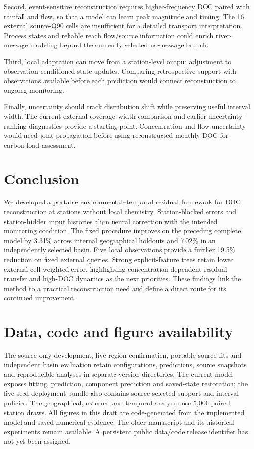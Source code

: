 \documentclass[11pt]{article}
\begin{document}
Second, event-sensitive reconstruction requires higher-frequency DOC paired with rainfall and flow, so that a model can learn peak magnitude and timing. The 16 external source-Q90 cells are insufficient for a detailed transport interpretation. Process states and reliable reach flow/source information could enrich river-message modeling beyond the currently selected no-message branch.

Third, local adaptation can move from a station-level output adjustment to observation-conditioned state updates. Comparing retrospective support with observations available before each prediction would connect reconstruction to ongoing monitoring.

Finally, uncertainty should track distribution shift while preserving useful interval width. The current external coverage--width comparison and earlier uncertainty-ranking diagnostics provide a starting point. Concentration and flow uncertainty would need joint propagation before using reconstructed monthly DOC for carbon-load assessment.

\section{Conclusion}
We developed a portable environmental--temporal residual framework for DOC reconstruction at stations without local chemistry. Station-blocked errors and station-hidden input histories align neural correction with the intended monitoring condition. The fixed procedure improves on the preceding complete model by 3.31\% across internal geographical holdouts and 7.02\% in an independently selected basin. Five local observations provide a further 19.5\% reduction on fixed external queries. Strong explicit-feature trees retain lower external cell-weighted error, highlighting concentration-dependent residual transfer and high-DOC dynamics as the next priorities. These findings link the method to a practical reconstruction need and define a direct route for its continued improvement.

\section*{Data, code and figure availability}
The source-only development, five-region confirmation, portable source fits and independent basin evaluation retain configurations, predictions, source snapshots and reproducible analyses in separate version directories. The current model exposes fitting, prediction, component prediction and saved-state restoration; the five-seed deployment bundle also contains source-selected support and interval policies. The geographical, external and temporal analyses use 5,000 paired station draws. All figures in this draft are code-generated from the implemented model and saved numerical evidence. The older manuscript and its historical experiments remain available. A persistent public data/code release identifier has not yet been assigned.
\end{document}
